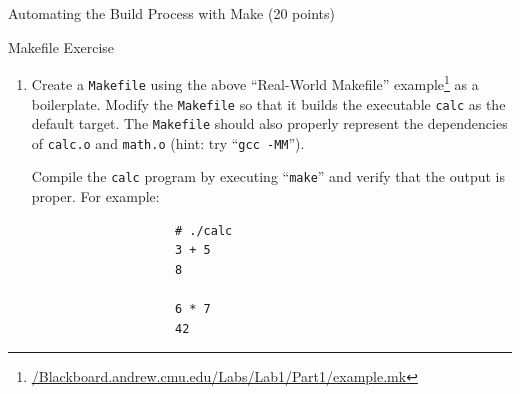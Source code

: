 \documentclass{article}
\begin{document}
\begin{section}{Automating the Build Process with Make (20 points)}
\begin{subsection}{Makefile Exercise}
\begin{enumerate}
\begin{item}
\begin{itemize}
						\item Performs the corresponding operation on the two input numbers using
						      the five \texttt{math.c} functions.

						\item Displays the signed decimal integer result on a separate line and
						      loops to accept another line of input.

						\item Or, for any invalid input, immediately terminates the program with
						      exit status 0.
					\end{itemize}
				\end{item}

				\item Create a \texttt{Makefile} using the above ``Real-World Makefile''
				      example\footnote{\url{/Blackboard.andrew.cmu.edu/Labs/Lab1/Part1/example.mk}} as a
				      boilerplate.  Modify the \texttt{Makefile} so that it builds the
				      executable \texttt{calc} as the default target.  The
				      \texttt{Makefile} should also properly represent the dependencies of
				      \texttt{calc.o} and \texttt{math.o} (hint: try ``\verb|gcc -MM|'').

				\begin{item}
					Compile the \texttt{calc} program by executing ``\verb|make|'' and verify
					that the output is proper.  For example:
					\begin{verbatim}
					# ./calc
					3 + 5
					8

					6 * 7
					42
					\end{verbatim}
				\end{item}
			\end{enumerate}
		\end{subsection}
	\end{section}
\end{document}
